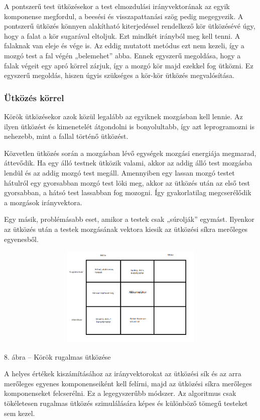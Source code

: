 \documentclass[]{article}
\begin{document}
A pontszerű test ütközésekor a test elmozdulási irányvektorának az egyik
komponense megfordul, a beesési és visszapattanási szög pedig
megegyezik. A pontszerű ütközés könnyen alakítható kiterjedéssel
rendelkező kör ütközésévé úgy, hogy a falat a kör sugarával eltoljuk.
Ezt mindkét irányból meg kell tenni. A falaknak van eleje és vége is. Az
eddig mutatott metódus ezt nem kezeli, így a mozgó test a fal végén
„belemehet'' abba. Ennek egyszerű megoldása, hogy a falak végeit egy
apró körrel zárjuk, így a mozgó kör majd ezekkel fog ütközni. Ez
egyszerű megoldás, hiszen úgyis szükséges a kör-kör ütközés
megvalósítása.

\hypertarget{uxfctkuxf6zuxe9s-kuxf6rrel}{%
\subsubsection{Ütközés körrel}\label{uxfctkuxf6zuxe9s-kuxf6rrel}}

Körök ütközésekor azok közül legalább az egyiknek mozgásban kell lennie.
Az ilyen ütközést és kimenetelét átgondolni is bonyolultabb, így azt
leprogramozni is nehezebb, mint a fallal történő ütközést.

Közvetlen ütközés során a mozgásban lévő egységek mozgási energiája
megmarad, áttevődik. Ha egy álló testnek ütközik valami, akkor az addig
álló test mozgásba lendül és az addig mozgó test megáll. Amennyiben egy
lassan mozgó testet hátulról egy gyorsabban mozgó test löki meg, akkor
az ütközés után az első test gyorsabban, a hátsó test lassabban fog
mozogni. Így gyakorlatilag megcserélődik a mozgások irányvektora.

Egy másik, problémásabb eset, amikor a testek csak „súrolják'' egymást.
Ilyenkor az ütközés után a testek mozgásának vektora kiesik az ütközési
síkra merőleges egyenesből.

\includegraphics[width=5.51181in,height=1.89525in]{media/image4.png}

8. ábra -- Körök rugalmas ütközése

A helyes értékek kiszámításához az irányvektorokat az ütközési sík és az
arra merőleges egyenes komponenseiként kell felírni, majd az ütközési
síkra merőleges komponenseket felcserélni. Ez a legegyszerűbb módszer.
Az algoritmus csak tökéletesen rugalmas ütközés szimulálására képes és
különböző tömegű testeket sem kezel.
\end{document}
